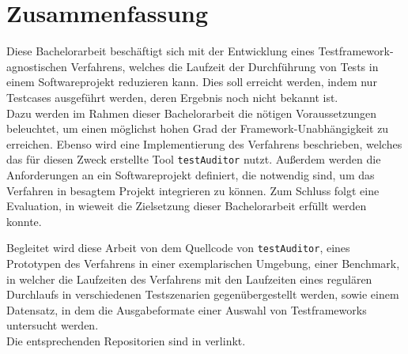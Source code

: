\chapter{Zusammenfassung}\label{chap:Zusammenfassung}
Diese Bachelorarbeit beschäftigt sich mit der Entwicklung eines Testframework-agnostischen Verfahrens, welches die Laufzeit der Durchführung von Tests in einem Softwareprojekt reduzieren kann. Dies soll erreicht werden, indem nur Testcases ausgeführt werden, deren Ergebnis noch nicht bekannt ist.\\
Dazu werden im Rahmen dieser Bachelorarbeit die nötigen Voraussetzungen beleuchtet, um einen möglichst hohen Grad der Framework-Unabhängigkeit zu erreichen. Ebenso wird eine Implementierung des Verfahrens beschrieben, welches das für diesen Zweck erstellte Tool \texttt{testAuditor} nutzt. Außerdem werden die Anforderungen an ein Softwareprojekt definiert, die notwendig sind, um das Verfahren in besagtem Projekt integrieren zu können. Zum Schluss folgt eine Evaluation, in wieweit die Zielsetzung dieser Bachelorarbeit erfüllt werden konnte.

Begleitet wird diese Arbeit von dem Quellcode von \texttt{testAuditor}, eines Prototypen des Verfahrens in einer exemplarischen Umgebung, einer Benchmark, in welcher die Laufzeiten des Verfahrens mit den Laufzeiten eines regulären Durchlaufs in verschiedenen Testszenarien gegenübergestellt werden, sowie einem Datensatz, in dem die Ausgabeformate einer Auswahl von Testframeworks untersucht werden.\\
Die entsprechenden Repositorien sind in  verlinkt.

